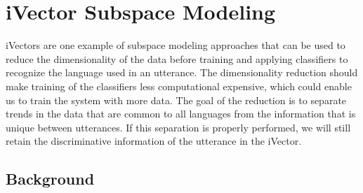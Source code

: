 \chapter{iVector Subspace Modeling}
\label{sect:ivecttheory}

iVectors are one example of subspace modeling approaches that can be used to reduce the dimensionality of the data before training and applying classifiers to recognize the language used in an utterance. The dimensionality reduction should make training of the classifiers less computational expensive, which could enable us to train the system with more data. The goal of the reduction is to separate trends in the data that are common to all languages from the information that is unique between utterances. If this separation is properly performed, we will still retain the discriminative information of the utterance in the iVector.

\section{Background}

